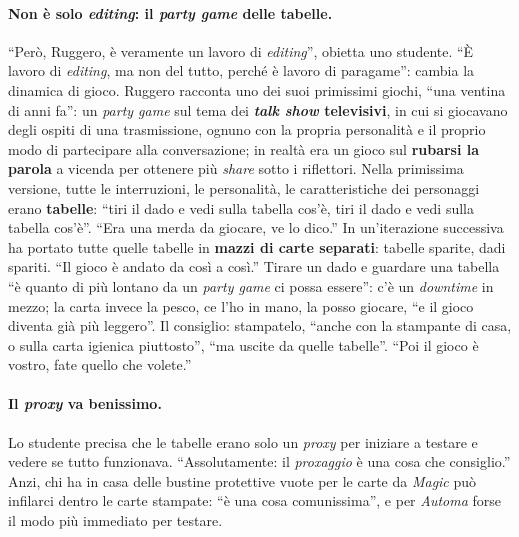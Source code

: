 \paragraph{Non è solo \emph{editing}: il \emph{party game} delle tabelle.} ``Però, Ruggero,
è veramente un lavoro di \emph{editing}'', obietta uno studente. ``È lavoro di
\emph{editing}, ma non del tutto, perché è lavoro di paragame'': cambia la dinamica di
gioco. Ruggero racconta uno dei suoi primissimi giochi, ``una ventina di anni fa'': un
\emph{party game} sul tema dei \textbf{\emph{talk show} televisivi}, in cui si giocavano
degli ospiti di una trasmissione, ognuno con la propria personalità e il proprio modo di
partecipare alla conversazione; in realtà era un gioco sul \textbf{rubarsi la parola} a
vicenda per ottenere più \emph{share} sotto i riflettori. Nella primissima versione, tutte
le interruzioni, le personalità, le caratteristiche dei personaggi erano \textbf{tabelle}:
``tiri il dado e vedi sulla tabella cos'è, tiri il dado e vedi sulla tabella cos'è''. ``Era
una merda da giocare, ve lo dico.'' In un'iterazione successiva ha portato tutte quelle
tabelle in \textbf{mazzi di carte separati}: tabelle sparite, dadi spariti. ``Il gioco è
andato da così a così.'' Tirare un dado e guardare una tabella ``è quanto di più lontano da
un \emph{party game} ci possa essere'': c'è un \emph{downtime} in mezzo; la carta invece la
pesco, ce l'ho in mano, la posso giocare, ``e il gioco diventa già più leggero''. Il
consiglio: stampatelo, ``anche con la stampante di casa, o sulla carta igienica
piuttosto'', ``ma uscite da quelle tabelle''. ``Poi il gioco è vostro, fate quello che
volete.''

\paragraph{Il \emph{proxy} va benissimo.} Lo studente precisa che le tabelle erano solo un
\emph{proxy} per iniziare a testare e vedere se tutto funzionava. ``Assolutamente: il
\emph{proxaggio} è una cosa che consiglio.'' Anzi, chi ha in casa delle bustine protettive
vuote per le carte da \emph{Magic} può infilarci dentro le carte stampate: ``è una cosa
comunissima'', e per \emph{Automa} forse il modo più immediato per testare.


